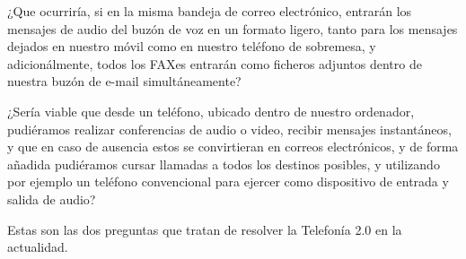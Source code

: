 ¿Que ocurriría, si en la misma bandeja de correo electrónico, entrarán los mensajes de audio del buzón de voz en un formato ligero, tanto para los mensajes dejados en nuestro móvil como en nuestro teléfono de sobremesa, y adicionálmente, todos los FAXes entrarán como ficheros adjuntos dentro de nuestra buzón de e-mail simultáneamente? 

¿Sería viable que desde un teléfono, ubicado dentro de nuestro ordenador, pudiéramos realizar conferencias de audio o video, recibir mensajes instantáneos, y que en caso de ausencia estos se convirtieran en correos electrónicos, y de forma añadida pudiéramos cursar llamadas a todos los destinos posibles, y utilizando por ejemplo un teléfono convencional para ejercer como dispositivo de entrada y salida de audio?

Estas son las dos preguntas que tratan de resolver la Telefonía 2.0 en la actualidad.